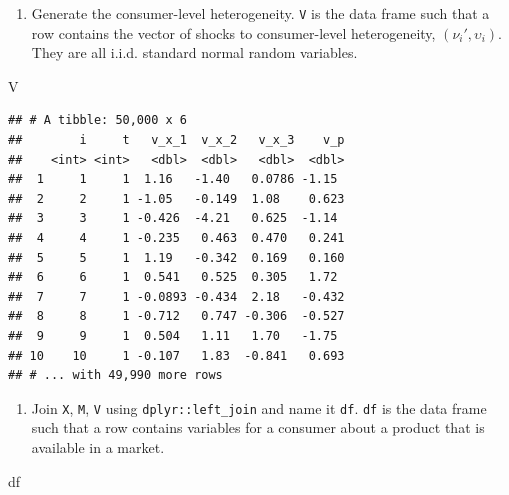 \documentclass[]{book}
\newenvironment{Shaded}{\begin{snugshade}}{\end{snugshade}}
\newcommand{\NormalTok}[1]{#1}
\providecommand{\tightlist}{%
  \setlength{\itemsep}{0pt}\setlength{\parskip}{0pt}}
\begin{document}
\begin{enumerate}
\def\labelenumi{\arabic{enumi}.}
\setcounter{enumi}{3}
\tightlist
\item
  Generate the consumer-level heterogeneity. \texttt{V} is the data
  frame such that a row contains the vector of shocks to consumer-level
  heterogeneity, \((\nu_{i}', \upsilon_i)\). They are all i.i.d.
  standard normal random variables.
\end{enumerate}

\begin{Shaded}
\begin{Highlighting}[]
\NormalTok{V}
\end{Highlighting}
\end{Shaded}

\begin{verbatim}
## # A tibble: 50,000 x 6
##        i     t   v_x_1  v_x_2   v_x_3    v_p
##    <int> <int>   <dbl>  <dbl>   <dbl>  <dbl>
##  1     1     1  1.16   -1.40   0.0786 -1.15 
##  2     2     1 -1.05   -0.149  1.08    0.623
##  3     3     1 -0.426  -4.21   0.625  -1.14 
##  4     4     1 -0.235   0.463  0.470   0.241
##  5     5     1  1.19   -0.342  0.169   0.160
##  6     6     1  0.541   0.525  0.305   1.72 
##  7     7     1 -0.0893 -0.434  2.18   -0.432
##  8     8     1 -0.712   0.747 -0.306  -0.527
##  9     9     1  0.504   1.11   1.70   -1.75 
## 10    10     1 -0.107   1.83  -0.841   0.693
## # ... with 49,990 more rows
\end{verbatim}

\begin{enumerate}
\def\labelenumi{\arabic{enumi}.}
\setcounter{enumi}{4}
\tightlist
\item
  Join \texttt{X}, \texttt{M}, \texttt{V} using
  \texttt{dplyr::left\_join} and name it \texttt{df}. \texttt{df} is the
  data frame such that a row contains variables for a consumer about a
  product that is available in a market.
\end{enumerate}

\begin{Shaded}
\begin{Highlighting}[]
\NormalTok{df}
\end{Highlighting}
\end{Shaded}
\end{document}

